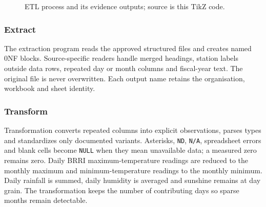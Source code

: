 \begin{figure}[H]
\centering
{}
\caption{ETL process and its evidence outputs; source is this TikZ code.}
\label{fig:etl-pipeline}
\end{figure}

\subsubsection{Extract}

The extraction program reads the \mSourceFiles{} approved structured files and
creates \mSourceBlocks{} named 0NF blocks. Source-specific readers handle
merged headings, station labels outside data rows, repeated day or month
columns and fiscal-year text. The original file is never overwritten. Each
output name retains the organisation, workbook and sheet identity.

\subsubsection{Transform}

Transformation converts repeated columns into explicit observations, parses
types and standardizes only documented variants. Asterisks, \texttt{ND},
\texttt{N/A}, spreadsheet errors and blank cells become \texttt{NULL} when
they mean unavailable data; a measured zero remains zero. Daily BRRI
maximum-temperature readings are reduced to the monthly maximum and
minimum-temperature readings to the monthly minimum. Daily rainfall is summed,
daily humidity is averaged and sunshine remains at day grain. The
transformation keeps the number of contributing days so sparse months remain
detectable.

